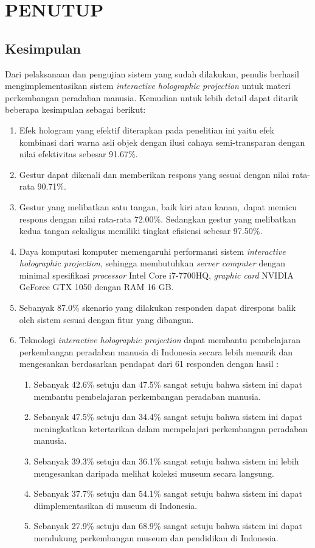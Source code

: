 \chapter{PENUTUP}
\vspace{4ex}

\section{Kesimpulan}
\vspace{1ex}
Dari pelaksanaan dan pengujian sistem yang sudah dilakukan, penulis berhasil mengimplementasikan sistem \textit{interactive holographic projection} untuk materi perkembangan peradaban manusia. Kemudian untuk lebih detail dapat ditarik beberapa kesimpulan sebagai berikut:
\begin{enumerate} [nolistsep]
	\item Efek hologram yang efektif diterapkan pada penelitian ini yaitu efek kombinasi dari warna asli objek dengan ilusi cahaya semi-transparan dengan nilai efektivitas sebesar 91.67\%.
	\item Gestur dapat dikenali dan memberikan respons yang sesuai dengan nilai rata-rata 90.71\%.
	\item Gestur yang melibatkan satu tangan, baik kiri atau kanan, dapat memicu respons dengan nilai rata-rata 72.00\%. Sedangkan gestur yang melibatkan kedua tangan sekaligus memiliki tingkat efisiensi sebesar 97.50\%.
	\item Daya komputasi komputer memengaruhi performansi sistem \textit{interactive holographic projection}, sehingga membutuhkan \textit{server computer} dengan minimal spesifikasi \textit{processor} Intel Core i7-7700HQ, \textit{graphic card} NVIDIA GeForce GTX 1050 dengan  RAM 16 GB.
	\item Sebanyak 87.0\% skenario yang dilakukan responden dapat direspons balik oleh sistem sesuai dengan fitur yang dibangun. 
	\item Teknologi \textit{interactive holographic projection} dapat membantu pembelajaran perkembangan peradaban manusia di Indonesia secara lebih menarik dan mengesankan berdasarkan pendapat dari 61 responden dengan hasil :
		\begin{enumerate}
			\item Sebanyak 42.6\% setuju dan 47.5\% sangat setuju bahwa sistem ini dapat membantu pembelajaran perkembangan peradaban manusia.
			\item Sebanyak 47.5\% setuju dan 34.4\% sangat setuju bahwa sistem ini dapat meningkatkan ketertarikan dalam mempelajari perkembangan peradaban manusia.
			\item Sebanyak 39.3\% setuju dan 36.1\% sangat setuju bahwa sistem ini lebih mengesankan daripada melihat koleksi museum secara langsung.
			\item Sebanyak 37.7\% setuju dan 54.1\% sangat setuju bahwa sistem ini dapat diimplementasikan di museum di Indonesia.
			\item Sebanyak 27.9\% setuju dan 68.9\% sangat setuju bahwa sistem ini dapat mendukung perkembangan museum dan pendidikan di Indonesia.
		\end{enumerate}
\end{enumerate}
\vspace{2ex}

